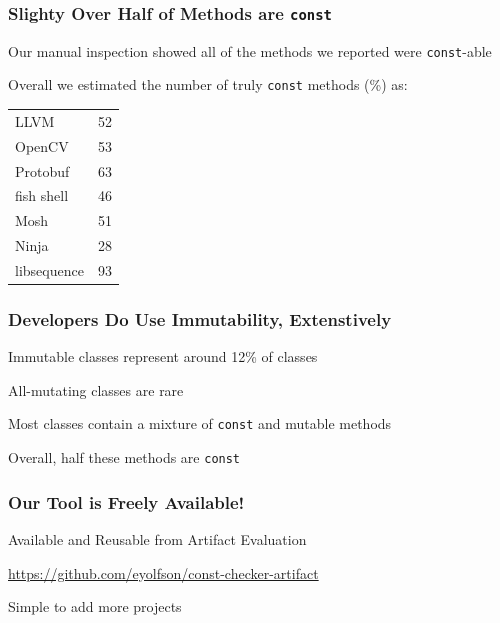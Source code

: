 \documentclass[aspectratio=169]{beamer}
\begin{document}
  \begin{frame}
    \frametitle{Slighty Over Half of Methods are \texttt{const}}

    Our manual inspection showed all of the methods we reported were
    \texttt{const}-able

    \vspace{2em}

    Overall we estimated the number of truly \texttt{const} methods (\%) as:

    \vspace{1em}
    
    \begin{tabular}{l r}
      LLVM         & 52\\
      OpenCV       & 53\\
      Protobuf     & 63 \\
      fish shell   & 46 \\
      Mosh         & 51 \\
      Ninja        & 28 \\
      libsequence  & 93 \\
    \end{tabular}
  \end{frame}

  \begin{frame}
    \frametitle{Developers Do Use Immutability, Extenstively}

    Immutable classes represent around 12\% of classes

    \hspace{1em} All-mutating classes are rare

    \vspace{2em}

    Most classes contain a mixture of \texttt{const} and mutable methods

    \hspace{1em} Overall, half these methods are \texttt{const}
  \end{frame}

  \begin{frame}
    \frametitle{Our Tool is Freely Available!}

    Available and Reusable from Artifact Evaluation

    \vspace{2em}

    \url{https://github.com/eyolfson/const-checker-artifact}

    \vspace{2em}

    Simple to add more projects
  \end{frame}
\end{document}
